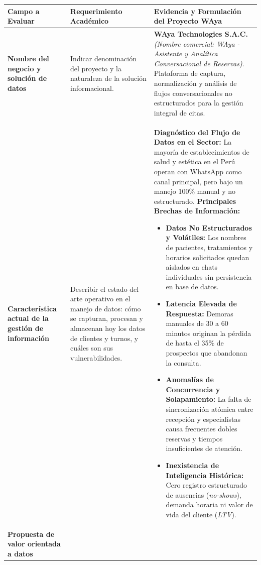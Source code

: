 \documentclass[12pt,a4paper]{report}
\begin{document}
\begin{table}[h!]
\centering
\scriptsize
\begin{tabularx}{\textwidth}{|p{3.2cm}|p{3.6cm}|X|}
\hline
\rowcolor{BrandPrimary!25}
\textbf{Campo a Evaluar} & \textbf{Requerimiento Académico} & \textbf{Evidencia y Formulación del Proyecto WAya} \\
\hline
\textbf{Nombre del negocio y solución de datos} & 
Indicar denominación del proyecto y la naturaleza de la solución informacional. & 
\textbf{WAya Technologies S.A.C.} \newline
\textit{(Nombre comercial: WAya - Asistente y Analítica Conversacional de Reservas)}. \newline
Plataforma de captura, normalización y análisis de flujos conversacionales no estructurados para la gestión integral de citas. \\
\hline
\textbf{Característica actual de la gestión de información} & 
Describir el estado del arte operativo en el manejo de datos: cómo se capturan, procesan y almacenan hoy los datos de clientes y turnos, y cuáles son sus vulnerabilidades. & 
\textbf{Diagnóstico del Flujo de Datos en el Sector:} \newline
La mayoría de establecimientos de salud y estética en el Perú operan con WhatsApp como canal principal, pero bajo un manejo 100\% manual y no estructurado. \newline
\textbf{Principales Brechas de Información:}
\begin{itemize}[leftmargin=1.0em, topsep=1pt, itemsep=1pt]
    \item \textbf{Datos No Estructurados y Volátiles:} Los nombres de pacientes, tratamientos y horarios solicitados quedan aislados en chats individuales sin persistencia en base de datos.
    \item \textbf{Latencia Elevada de Respuesta:} Demoras manuales de 30 a 60 minutos originan la pérdida de hasta el 35\% de prospectos que abandonan la consulta.
    \item \textbf{Anomalías de Concurrencia y Solapamiento:} La falta de sincronización atómica entre recepción y especialistas causa frecuentes dobles reservas y tiempos insuficientes de atención.
    \item \textbf{Inexistencia de Inteligencia Histórica:} Cero registro estructurado de ausencias (\textit{no-shows}), demanda horaria ni valor de vida del cliente (\textit{LTV}).
\end{itemize} \\
\hline
\textbf{Propuesta de valor orientada a datos} & 

\end{tabularx}
\end{table}
\end{document}

